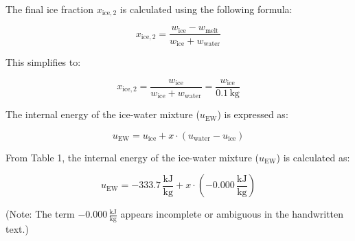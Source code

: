 The final ice fraction \( x_{\text{ice},2} \) is calculated using the following formula:  

\[
x_{\text{ice},2} = \frac{w_{\text{ice}} - w_{\text{melt}}}{w_{\text{ice}} + w_{\text{water}}}
\]

This simplifies to:  

\[
x_{\text{ice},2} = \frac{w_{\text{ice}}}{w_{\text{ice}} + w_{\text{water}}} = \frac{w_{\text{ice}}}{0.1 \, \text{kg}}
\]

The internal energy of the ice-water mixture (\( u_{\text{EW}} \)) is expressed as:  

\[
u_{\text{EW}} = u_{\text{ice}} + x \cdot (u_{\text{water}} - u_{\text{ice}})
\]

From Table 1, the internal energy of the ice-water mixture (\( u_{\text{EW}} \)) is calculated as:  

\[
u_{\text{EW}} = -333.7 \, \frac{\text{kJ}}{\text{kg}} + x \cdot (-0.000 \, \frac{\text{kJ}}{\text{kg}})
\]  

(Note: The term \( -0.000 \, \frac{\text{kJ}}{\text{kg}} \) appears incomplete or ambiguous in the handwritten text.)